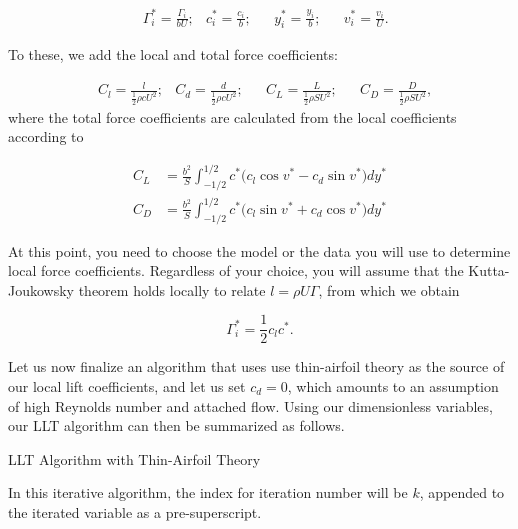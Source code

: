 \documentclass[11pt,letter]{ejlnotes}
\begin{document}
{		\begin{align}
			&\Gamma_i^* = \frac{\Gamma_i}{b U}; 
			&c_i^* = \frac{c_i}{b}; &&y_i^* = \frac{y_i}{b}; &&v_i^* = \frac{v_i}{U}.
		\end{align}
			
		To these, we add the local and total force coefficients:
		
		\begin{align}
		&C_l = \frac{l}{\frac{1}{2} \rho c U^2}; &C_d = \frac{d}{\frac{1}{2} \rho c U^2}; &&C_L = \frac{L}{\frac{1}{2}\rho S U^2}; &&C_D = \frac{D}{\frac{1}{2}\rho S U^2},
		\end{align}
		where the total force coefficients are calculated from the local coefficients according to
		
		\begin{align}
			C_L &= \frac{b^2}{S} \int_{-1/2}^{1/2} c^* \bigg( c_l \cos v^* - c_d \sin v^* \bigg) dy^* \label{eq:CL} \\
			C_D &= \frac{b^2}{S} \int_{-1/2}^{1/2} c^* \bigg( c_l \sin v^* + c_d \cos v^* \bigg) dy^* \label{eq:CD}
		\end{align}
		
		At this point, you need to choose the model or the data you will use to determine local force coefficients.  Regardless of your choice, you will assume that the Kutta-Joukowsky theorem holds locally to relate $l = \rho U \Gamma$, from which we obtain 
		
		\begin{equation}
			\Gamma_i^* = \frac{1}{2} c_l c^*. \label{eq:Gammacl}
		\end{equation}
		
		Let us now finalize an algorithm that uses use thin-airfoil theory as the source of our local lift coefficients, and let us set $c_d = 0$, which amounts to an assumption of high Reynolds number and attached flow.  Using our dimensionless variables, our LLT algorithm can then be summarized as follows.
		
		\begin{callouttitle}{LLT Algorithm with Thin-Airfoil Theory}
			
			In this iterative algorithm, the index for iteration number will be $k$, appended to the iterated variable as a pre-superscript.
			

\end{callouttitle}}
\end{document}
